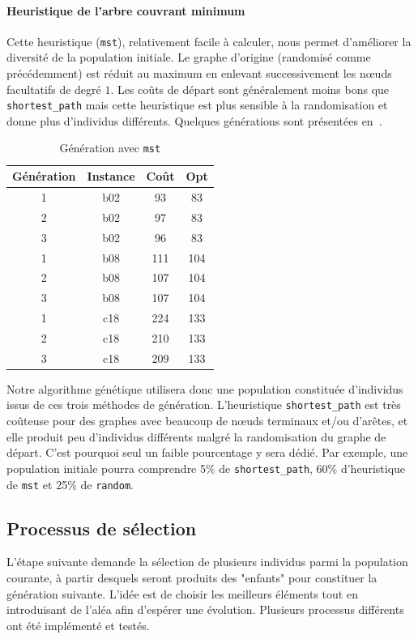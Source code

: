 \documentclass[10pt]{article}
\begin{document}
		\paragraph{Heuristique de l'arbre couvrant minimum}{
		Cette heuristique (\texttt{mst}), relativement facile à calculer, nous permet d'améliorer la diversité de la population initiale. Le graphe d'origine (randomisé comme précédemment) est réduit au maximum en enlevant successivement les nœuds facultatifs de degré $1$. Les coûts de départ sont généralement moins bons que \texttt{shortest\_path} mais cette heuristique est plus sensible à la randomisation et donne plus d'individus différents. Quelques générations sont présentées en~.
		
		\begin{table}[h!]
			\centering
			\begin{tabular}{|c|c|c|c|}
				\hline
				\textbf{Génération} & \textbf{Instance} & \textbf{Coût} & \textbf{Opt} \\
				\hline
				1&b02  & 93  &83 \\
				2&b02  & 97   &83\\
				3&b02  & 96  &83 \\
				1&b08  & 111  &104\\
				2&b08  & 107  &104\\
				3&b08  & 107  &104\\
				1&c18  & 224  &133\\
				2&c18  & 210  &133\\
				3&c18  & 209  &133\\
				\hline
			\end{tabular}
			\caption{Génération avec \texttt{mst}}
			\label{tab-mstinit}
		\end{table}
		}
		
		Notre algorithme génétique utilisera donc une population constituée d'individus issus de ces trois méthodes de génération. L'heuristique \texttt{shortest\_path} est très coûteuse pour des graphes avec beaucoup de nœuds terminaux et/ou d'arêtes, et elle produit peu d'individus différents malgré la randomisation du graphe de départ. C'est pourquoi seul un faible pourcentage y sera dédié. Par exemple, une population initiale pourra comprendre 5\% de \texttt{shortest\_path}, 60\% d'heuristique de \texttt{mst} et 25\% de \texttt{random}.

	\subsection{Processus de sélection}
		L'étape suivante demande la sélection de plusieurs individus parmi la population courante, à partir desquels seront produits des "enfants" pour constituer la génération suivante. L'idée est de choisir les meilleurs éléments tout en introduisant de l'aléa afin  d'espérer une évolution. Plusieurs processus différents ont été implémenté et testés.
		
\end{document}
